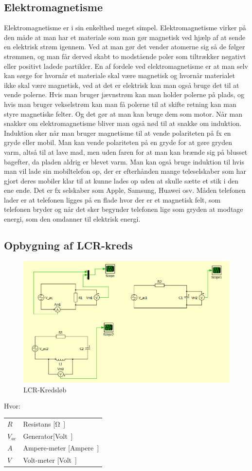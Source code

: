 \subsection{Elektromagnetisme}
Elektromagnetisme er i sin enkelthed meget simpel. Elektromagnetisme virker på den måde at man har et materiale som man gør magnetisk ved hjælp af at sende en elektrisk strøm igennem. Ved at man gør det vender atomerne sig så de følger strømmen, og man får derved skabt to modstående poler som tiltrækker negativt eller positivt ladede partikler. En af fordele ved elektromagnetisme er at man selv kan sørge for hvornår et materiale skal være magnetisk og hvornår materialet ikke skal være magnetisk, ved at det er elektrisk kan man også bruge det til at vende polerne. Hvis man bruger jævnstrøm kan man holder polerne på plads, og hvis man bruger vekselstrøm kan man få polerne til at skifte retning kan man styre magnetiske felter. Og det gør at man kan bruge dem som motor. Når man snakker om elektromagnetisme bliver man også nød til at snakke om induktion. Induktion sker når man bruger magnetisme til at vende polariteten på fx en gryde eller mobil. Man kan vende polariteten på en gryde for at gøre gryden varm, altså til at lave mad, men uden faren for at man kan brænde sig på blusset bagefter, da pladen aldrig er blevet varm. Man kan også bruge induktion til hvis man vil lade sin mobiltelefon op, der er efterhånden mange teleselskaber som har gjort deres mobiler klar til at kunne lades op uden at skulle sætte et stik i den ene ende. Det er fx selskaber som Apple, Samsung, Huawei osv. Måden telefonen lader er at telefonen ligges på en flade hvor der er et magnetisk felt, som telefonen bryder og når det sker begynder telefonen lige som gryden at modtage energi, som den omdanner til elektrisk energi.

\newpage
\subsection{Opbygning af LCR-kreds}
\begin{figure}[htbp]
	\centering
	\includegraphics[width=1\textwidth]{Vildledning/Schematics/Eks1_LCR.png}
	\caption{LCR-Kredsløb}
	\label{forslag1}
\end{figure}

Hvor:
\begin{table}[H]
	\begin{tabular}{l|l}
	$R$     & Resistans [\si \ohm] \\
	$V_{ac}$ 	   &  Generator[\si Volt] \\
	$A$ 	   & Ampere-meter [\si Ampere] \\
	$V$			& Volt-meter [\si Volt]
	\end{tabular}
\end{table}

